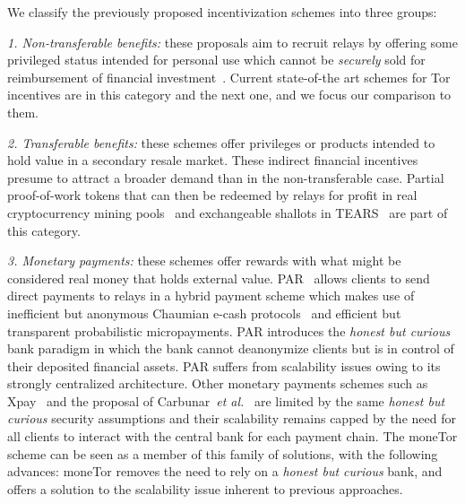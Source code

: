 We classify the previously proposed incentivization schemes into three groups:

\noindent	\emph{1. Non-transferable benefits:} these proposals aim to recruit relays by offering some
	 privileged status intended for personal use which cannot be \emph{securely} sold for reimbursement
	  of financial investment~\cite{dingledine2010building,jansen2010recruiting, jansen2013lira}. Current state-of-the art schemes for Tor incentives are in this category and the next one, and we focus our comparison to them.
	  
\noindent	\emph{2. Transferable benefits:} these schemes offer
privileges or products intended to hold value in a secondary resale market. These
indirect financial incentives presume to attract a broader demand than in the
non-transferable case. Partial proof-of-work tokens that can then be redeemed by relays for
profit in real cryptocurrency mining pools~\cite{biryukov2015proof} and exchangeable shallots in TEARS~\cite{jansen2014onions} are part of this category.

\noindent \emph{3. Monetary payments:} these schemes offer rewards
with what might be considered real money that holds external
value. PAR~\cite{androulaki2008payment} allows clients to send direct
payments to relays in a hybrid payment scheme which makes use of
inefficient but anonymous Chaumian e-cash
protocols~\cite{chaum1988untraceable} and efficient but transparent
probabilistic micropayments. PAR introduces the \emph{honest but
  curious} bank paradigm in which the bank cannot deanonymize clients
but is in control of their deposited financial assets. PAR suffers
from scalability issues owing to its strongly centralized
architecture. Other monetary payments schemes such as
Xpay~\cite{chen2009xpay} and the proposal of Carbunar~\textit{et
  al.}~\cite{carbunar2012tipping} are limited by the same \emph{honest
  but curious} security assumptions and their scalability remains
capped by the need for all clients to interact with the central bank
for each payment chain. The moneTor scheme can be seen as a member of
this family of solutions, with the following advances: moneTor removes
the need to rely on a \textit{honest but curious} bank, and offers a
solution to the scalability issue inherent to previous approaches.



